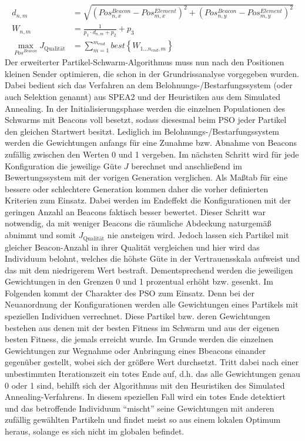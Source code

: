 \begin{align*}
d_{n,m} &= \sqrt{\left ( Pos^{Beacon}_{n,x} - Pos^{Element}_{m,x}\right )^2 + \left ( Pos^{Beacon}_{n,y} - Pos^{Element}_{m,y}\right )^2}\\
W_{n,m} &= \frac{1}{p_1\cdot d_{n,m}+p_2} + p_3\\
\underset{Pos^{Beacon}}{\max} J_{\text{Qualität}} &= \sum_{m=1}^{m_{end}}best\left \{ W_{1...n_{end},m} \right \}
\end{align*}
Der erweiterter Partikel-Schwarm-Algorithmus muss nun nach den Positionen kleinen Sender optimieren, die schon in der Grundrissanalyse vorgegeben wurden. Dabei bedient sich das Verfahren an dem Belohnungs-/Bestarfungssystem (oder auch Selektion genannt) aus SPEA2 und der Heuristiken aus dem Simulated Annealing. In der Initialisierungsphase werden die einzelnen Populationen des Schwarms mit Beacons voll besetzt, sodass diesesmal beim PSO jeder Partikel den gleichen Startwert besitzt. Lediglich im Belohnungs-/Bestarfungssystem werden die Gewichtungen anfangs für eine Zunahme bzw. Abnahme von Beacons zufällig zwischen den Werten 0 und 1 vergeben. Im nächsten Schritt wird für jede Konfiguration die jeweilige Güte $J$ berechnet und anschließend im Bewertungssystem mit der vorigen Generation verglichen. Als Maßtab für eine bessere oder schlechtere Generation kommen daher die vorher definierten Kriterien zum Einsatz. Dabei werden im Endeffekt die Konfigurationen mit der geringen Anzahl an Beacons faktisch besser bewertet. Dieser Schritt war notwendig, da mit weniger Beacons die räumliche Abdeckung naturgemäß abnimmt und somit $J_{\text{Qualität}}$ nie ansteigen wird. Jedoch lassen sich Partikel mit gleicher Beacon-Anzahl in ihrer Qualität vergleichen und hier wird das Individuum belohnt, welches die höhste Güte in der Vertrauensskala aufweist und das mit dem niedrigerem Wert bestraft. Dementsprechend werden die jeweiligen Gewichtungen in den Grenzen 0 und 1 prozentual erhöht bzw. gesenkt. Im Folgenden kommt der Charakter des PSO zum Einsatz. Denn bei der Neuanordnung der Konfigurationen werden alle Gewichtungen eines Partikels mit speziellen Individuen verrechnet. Diese Partikel bzw. deren Gewichtungen bestehen aus denen mit der besten Fitness im Schwarm und aus der eigenen besten Fitness, die jemals erreicht wurde. Im Grunde werden die einzelnen Gewichtungen zur Wegnahme oder Anbringung eines Bbeacons einander gegenüber gestellt, wobei sich der größere Wert durchsetzt. Tritt dabei nach einer unbestimmten Iterationszeit ein totes Ende auf, d.h. das alle Gewichtungen genau 0 oder 1 sind, behilft sich der Algorithmus mit den Heuristiken des Simulated Annealing-Verfahrens. In diesem speziellen Fall wird ein totes Ende detektiert und das betroffende Individuum "`mischt"' seine Gewichtungen mit anderen zufällig gewählten Partikeln und findet meist so aus einem lokalen Optimum heraus, solange es sich nicht im globalen befindet. \\ \\
